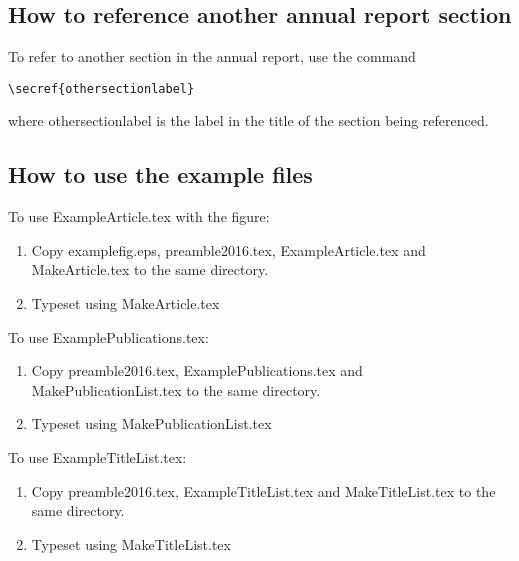 \documentclass[twoside,11pt]{article}
\begin{document}
\subsection{How to reference another annual report section}

To refer to another section in the annual report, use the command

\begin{verbatim}
\secref{othersectionlabel} 
\end{verbatim}

\noindent
where {othersectionlabel} is the label in the title of the section being referenced.

\subsection{How to use the example files}

To use ExampleArticle.tex with the figure:

\begin{enumerate}
\item Copy examplefig.eps, preamble2016.tex, ExampleArticle.tex and MakeArticle.tex to the same directory.
\item Typeset using MakeArticle.tex
\end{enumerate}

\noindent
To use ExamplePublications.tex:

\begin{enumerate}
\item Copy preamble2016.tex, ExamplePublications.tex and MakePublicationList.tex to the same directory.
\item Typeset using MakePublicationList.tex
\end{enumerate}

\noindent
To use ExampleTitleList.tex:

\begin{enumerate}
\item Copy preamble2016.tex, ExampleTitleList.tex and MakeTitleList.tex to the same directory.
\item Typeset using MakeTitleList.tex
\end{enumerate}
\end{document}
